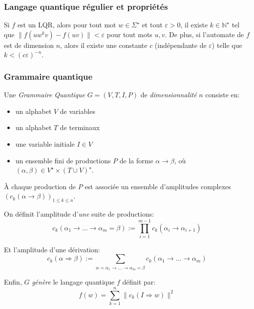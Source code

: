 \documentclass[aspectratio=169]{beamer}
\theoremstyle{plain}
\theoremstyle{definition}
\begin{document}
\begin{frame}
    \frametitle{Langage quantique régulier et propriétés}
    \begin{theorem}
        Si $f$ est un LQR, alors pour tout mot $w\in\Sigma^\star$ et tout $\varepsilon > 0$, il existe $k\in \mathbb{N}^\star$ tel que $\|f(uw^kv) - f(uv)\| < \varepsilon$ pour tout mots $u, v$. De plus, si l'automate de $f$ est de dimension $n$, alors il existe une constante $c$ (indépendante de $\varepsilon$) telle que $k < (c\varepsilon)^{-n}$.
    \end{theorem}
\end{frame}

\begin{frame}
    \frametitle{Grammaire quantique}
    \begin{definition}
        Une \emph{Grammaire Quantique} $G=(V, T, I, P)$ de \emph{dimensionnalité} $n$ consiste en:
        \begin{itemize}[label=--, noitemsep]
            \item un alphabet $V$ de variables
            \item un alphabet $T$ de terminaux
            \item une variable initiale $I\in V$
            \item un ensemble fini de productions $P$ de la forme $\alpha\to \beta$, où $(\alpha, \beta)\in V^\star\times (T\cup V)^\star$.
        \end{itemize}
        
    \end{definition}
\end{frame}

\begin{frame}
    À chaque production de $P$ est associée un ensemble d'amplitudes complexes $\left(c_k(\alpha\to\beta)\right)_{1\leq k\leq n}$.
    
    On définit l'amplitude d'\emph{une} suite de productions:
    \begin{equation*}
        c_k(\alpha_1 \to \dots \to \alpha_m=\beta) := \prod_{i=1}^{m-1} c_k(\alpha_i\to\alpha_{i+1})
    \end{equation*}

    Et l'amplitude d'une dérivation:
    \begin{equation*}
        c_k(\alpha\Rightarrow\beta) := \sum_{\alpha=\alpha_1 \to \dots \to \alpha_m=\beta} c_k(\alpha_1 \to \dots \to \alpha_m)
    \end{equation*}

    Enfin, $G$ \emph{génère} le langage quantique $f$ définit par:
    \begin{equation*}
        f(w) = \sum_{k=1}^n \|c_k(I\Rightarrow w)\|^2
    \end{equation*}
\end{frame}
\end{document}
